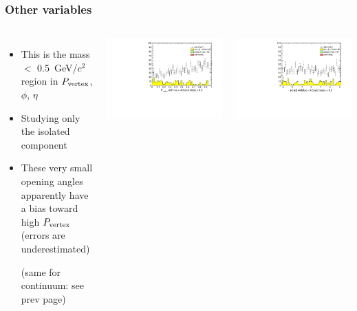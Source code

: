\documentclass[compress]{beamer}
\newcommand{\s}[1]{{\mbox{\scriptsize #1}}}
\begin{document}
\begin{frame}
\frametitle{Other variables}
\begin{columns}
\begin{itemize}
\item This is the mass $<$ 0.5~GeV/$c^2$ region in
  $P_\s{vertex}$, $\phi$, $\eta$
\item Studying only the isolated component
\item These very small opening angles apparently have a bias toward
  high $P_\s{vertex}$ (errors are underestimated)

(same for continuum: see prev page)
\end{itemize}

\includegraphics[width=\linewidth]{lowdimuon_vprob_lowmass_isolated.pdf}

\includegraphics[width=\linewidth]{lowdimuon_phi_lowmass_isolated.pdf}


\end{columns}
\end{frame}
\end{document}
